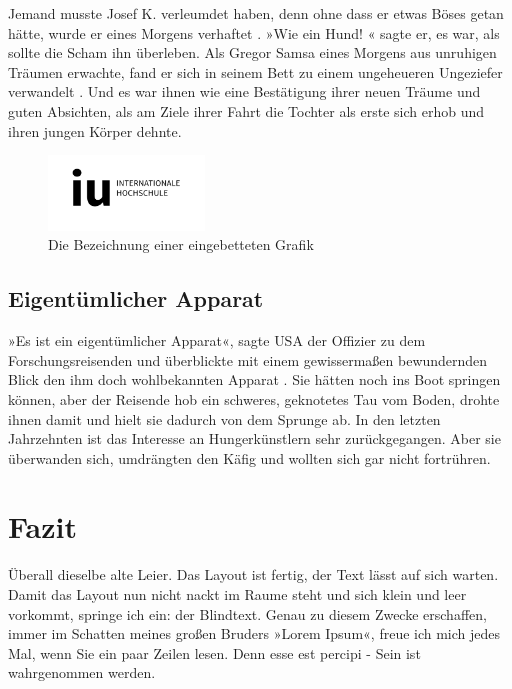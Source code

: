 Jemand musste Josef K. verleumdet haben, denn ohne dass er etwas Böses getan hätte, wurde er eines Morgens verhaftet \cite{mitrednf2021}. »Wie ein Hund! « sagte er, es war, als sollte die Scham ihn überleben. Als Gregor Samsa eines Morgens aus unruhigen Träumen erwachte, fand er sich in seinem Bett  zu einem ungeheueren Ungeziefer verwandelt . Und es war ihnen wie eine Bestätigung ihrer neuen Träume und guten Absichten, als am Ziele ihrer Fahrt die Tochter als erste sich erhob und ihren jungen Körper dehnte.
 
\begin{figure}
\centering
\caption{Die Bezeichnung einer eingebetteten Grafik}
\label{fig:chasm}
\includegraphics[height=2cm]{images/iu_logo.png}
\end{figure} 

\subsection{Eigentümlicher Apparat}

 »Es ist ein eigentümlicher Apparat«, sagte \ac{USA}  der Offizier zu dem Forschungsreisenden und überblickte mit einem gewissermaßen bewundernden Blick den ihm doch wohlbekannten Apparat \parencite[182-185]{syme2011f}. Sie hätten noch ins Boot springen können, aber der Reisende hob ein schweres, geknotetes Tau vom Boden, drohte ihnen damit und hielt sie dadurch von dem Sprunge ab. In den letzten Jahrzehnten ist das Interesse an Hungerkünstlern sehr zurückgegangen. Aber sie überwanden sich, umdrängten den Käfig und wollten sich gar nicht fortrühren. 


\section{Fazit}

Überall dieselbe alte Leier. Das Layout ist fertig, der Text lässt auf sich warten. Damit das Layout nun nicht nackt im Raume steht und sich klein und leer vorkommt, springe ich ein: der Blindtext. Genau zu diesem Zwecke erschaffen, immer im Schatten meines großen Bruders »Lorem Ipsum«, freue ich mich jedes Mal, wenn Sie ein paar Zeilen lesen. Denn esse est percipi - Sein ist wahrgenommen werden.

